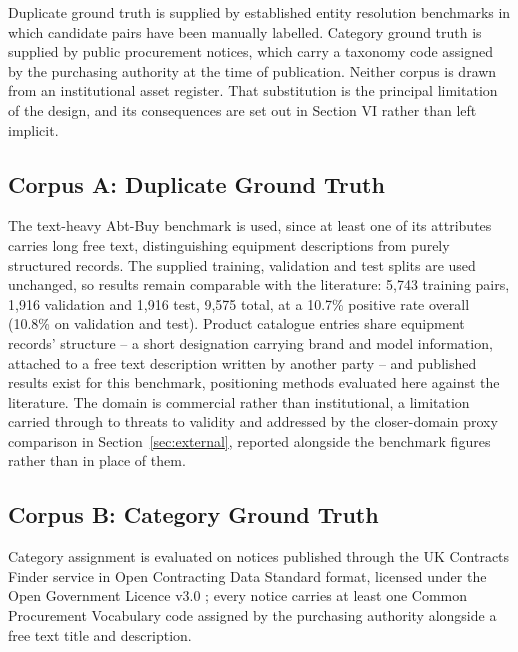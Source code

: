 \documentclass[conference]{IEEEtran}
\begin{document}
Duplicate ground truth is supplied by established entity resolution
benchmarks in which candidate pairs have been manually labelled. Category
ground truth is supplied by public procurement notices, which carry a
taxonomy code assigned by the purchasing authority at the time of
publication. Neither corpus is drawn from an institutional asset
register. That substitution is the principal limitation of the design,
and its consequences are set out in Section VI rather than left
implicit.

\subsection{Corpus A: Duplicate Ground Truth}

The text-heavy Abt-Buy benchmark \cite{mudgal2018,koepcke2010,leipzigdbs}
is used, since at least one of its attributes carries long free text,
distinguishing equipment descriptions from purely structured records.
The supplied training, validation and test splits are used unchanged,
so results remain comparable with the literature: 5,743 training
pairs, 1,916 validation and 1,916 test, 9,575 total, at a 10.7\%
positive rate overall (10.8\% on validation and test). Product
catalogue entries share equipment records' structure -- a short
designation carrying brand and model information, attached to a free
text description written by another party -- and published results
exist for this benchmark, positioning methods evaluated here against
the literature. The domain is commercial rather than institutional, a
limitation carried through to threats to validity and addressed by the
closer-domain proxy comparison in Section~\ref{sec:external}, reported
alongside the benchmark figures rather than in place of them.

\subsection{Corpus B: Category Ground Truth}

Category assignment is evaluated on notices published through the UK
Contracts Finder service in Open Contracting Data Standard format,
licensed under the Open Government Licence v3.0 \cite{contractsfinder};
every notice carries at least one Common Procurement Vocabulary code
assigned by the purchasing authority alongside a free text title and
description.
\end{document}

